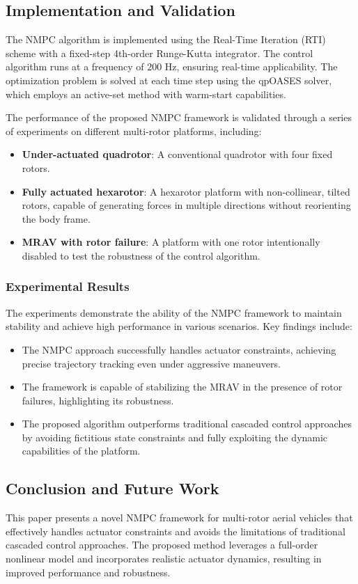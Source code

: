 \documentclass[a4paper,12pt]{article}
\begin{document}
    \subsection{Implementation and Validation}
    The NMPC algorithm is implemented using the Real-Time Iteration (RTI) scheme with a fixed-step 4th-order Runge-Kutta integrator. The control algorithm runs at a frequency of 200 Hz, ensuring real-time applicability. The optimization problem is solved at each time step using the qpOASES solver, which employs an active-set method with warm-start capabilities.

    The performance of the proposed NMPC framework is validated through a series of experiments on different multi-rotor platforms, including:
    \begin{itemize}
        \item \textbf{Under-actuated quadrotor}: A conventional quadrotor with four fixed rotors.
        \item \textbf{Fully actuated hexarotor}: A hexarotor platform with non-collinear, tilted rotors, capable of generating forces in multiple directions without reorienting the body frame.
        \item \textbf{MRAV with rotor failure}: A platform with one rotor intentionally disabled to test the robustness of the control algorithm.
    \end{itemize}

    \subsubsection{Experimental Results}
    The experiments demonstrate the ability of the NMPC framework to maintain stability and achieve high performance in various scenarios. Key findings include:
    \begin{itemize}
        \item The NMPC approach successfully handles actuator constraints, achieving precise trajectory tracking even under aggressive maneuvers.
        \item The framework is capable of stabilizing the MRAV in the presence of rotor failures, highlighting its robustness.
        \item The proposed algorithm outperforms traditional cascaded control approaches by avoiding fictitious state constraints and fully exploiting the dynamic capabilities of the platform.
    \end{itemize}

    \subsection{Conclusion and Future Work}
    This paper presents a novel NMPC framework for multi-rotor aerial vehicles that effectively handles actuator constraints and avoids the limitations of traditional cascaded control approaches. The proposed method leverages a full-order nonlinear model and incorporates realistic actuator dynamics, resulting in improved performance and robustness.
\end{document}
